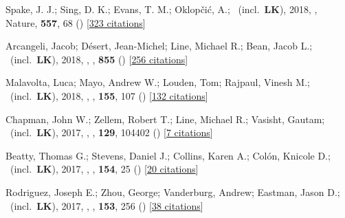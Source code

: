 \item[{\color{numcolor}\scriptsize19}] Spake, J. J.; Sing, D. K.; Evans, T. M.; Oklop{\v{c}}i{\'c}, A.; \etal\ (incl.\ \textbf{LK}), 2018, , Nature, \textbf{557}, 68 () [\href{https://ui.adsabs.harvard.edu/abs/2018Natur.557...68S}{323 citations}]

\item[{\color{numcolor}\scriptsize18}] Arcangeli, Jacob; D{\'e}sert, Jean-Michel; Line, Michael R.; Bean, Jacob L.; \etal\ (incl.\ \textbf{LK}), 2018, , \apj, \textbf{855} () [\href{https://ui.adsabs.harvard.edu/abs/2018ApJ...855L..30A}{256 citations}]

\item[{\color{numcolor}\scriptsize17}] Malavolta, Luca; Mayo, Andrew W.; Louden, Tom; Rajpaul, Vinesh M.; \etal\ (incl.\ \textbf{LK}), 2018, , \aj, \textbf{155}, 107 () [\href{https://ui.adsabs.harvard.edu/abs/2018AJ....155..107M}{132 citations}]

\item[{\color{numcolor}\scriptsize16}] Chapman, John W.; Zellem, Robert T.; Line, Michael R.; Vasisht, Gautam; \etal\ (incl.\ \textbf{LK}), 2017, , \pasp, \textbf{129}, 104402 () [\href{https://ui.adsabs.harvard.edu/abs/2017PASP..129j4402C}{7 citations}]

\item[{\color{numcolor}\scriptsize15}] Beatty, Thomas G.; Stevens, Daniel J.; Collins, Karen A.; Col{\'o}n, Knicole D.; \etal\ (incl.\ \textbf{LK}), 2017, , \aj, \textbf{154}, 25 () [\href{https://ui.adsabs.harvard.edu/abs/2017AJ....154...25B}{20 citations}]

\item[{\color{numcolor}\scriptsize14}] Rodriguez, Joseph E.; Zhou, George; Vanderburg, Andrew; Eastman, Jason D.; \etal\ (incl.\ \textbf{LK}), 2017, , \aj, \textbf{153}, 256 () [\href{https://ui.adsabs.harvard.edu/abs/2017AJ....153..256R}{38 citations}]

